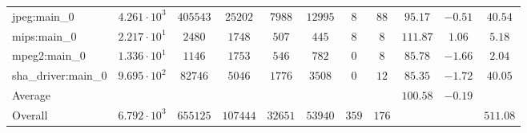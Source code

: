 \begin{tabular}{|l|c|c|c|c|c|c|c|c|c|c|}
jpeg:main\_0            & $ 4.261 \cdot 10^{3}  $ & $ 405543 $ & $ 25202  $ & $ 7988  $ & $ 12995 $ & $ 8   $ & $ 88  $ & $ 95.17       $ & $ -0.51   $ & $ 40.54   $ \\
mips:main\_0            & $ 2.217 \cdot 10^{1}  $ & $ 2480   $ & $ 1748   $ & $ 507   $ & $ 445   $ & $ 8   $ & $ 8   $ & $ 111.87      $ & $ 1.06    $ & $ 5.18    $ \\
mpeg2:main\_0           & $ 1.336 \cdot 10^{1}  $ & $ 1146   $ & $ 1753   $ & $ 546   $ & $ 782   $ & $ 0   $ & $ 8   $ & $ 85.78       $ & $ -1.66   $ & $ 2.04    $ \\
sha\_driver:main\_0     & $ 9.695 \cdot 10^{2}  $ & $ 82746  $ & $ 5046   $ & $ 1776  $ & $ 3508  $ & $ 0   $ & $ 12  $ & $ 85.35       $ & $ -1.72   $ & $ 40.05   $ \\
\hline
Average                 & $                     $ & $        $ & $        $ & $       $ & $       $ & $     $ & $     $ & $ 100.58      $ & $ -0.19   $ & $         $ \\
\hline
Overall                 & $ 6.792 \cdot 10^{3}  $ & $ 655125 $ & $ 107444 $ & $ 32651 $ & $ 53940 $ & $ 359 $ & $ 176 $ & $             $ & $         $ & $ 511.08  $ \\
\hline
\end{tabular}

